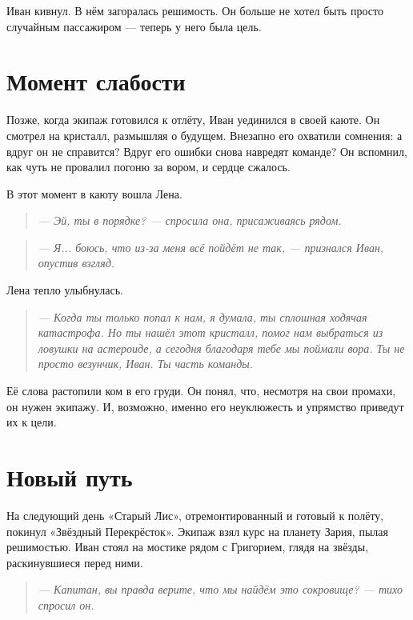 \documentclass[12pt,a4paper]{book} %
\newenvironment{dialogue}{\begin{quote}\itshape}{\end{quote}}
\begin{document}
Иван кивнул. В нём загоралась решимость. Он больше не хотел быть просто случайным пассажиром --- теперь у него была цель.

\section*{Момент слабости}

Позже, когда экипаж готовился к отлёту, Иван уединился в своей каюте. Он смотрел на кристалл, размышляя о будущем. Внезапно его охватили сомнения: а вдруг он не справится? Вдруг его ошибки снова навредят команде? Он вспомнил, как чуть не провалил погоню за вором, и сердце сжалось.

В этот момент в каюту вошла Лена.

\begin{dialogue}
--- Эй, ты в порядке? --- спросила она, присаживаясь рядом.
\end{dialogue}

\begin{dialogue}
--- Я... боюсь, что из-за меня всё пойдёт не так, --- признался Иван, опустив взгляд.
\end{dialogue}

Лена тепло улыбнулась.

\begin{dialogue}
--- Когда ты только попал к нам, я думала, ты сплошная ходячая катастрофа. Но ты нашёл этот кристалл, помог нам выбраться из ловушки на астероиде, а сегодня благодаря тебе мы поймали вора. Ты не просто везунчик, Иван. Ты часть команды.
\end{dialogue}

Её слова растопили ком в его груди. Он понял, что, несмотря на свои промахи, он нужен экипажу. И, возможно, именно его неуклюжесть и упрямство приведут их к цели.

\section*{Новый путь}

На следующий день «Старый Лис», отремонтированный и готовый к полёту, покинул «Звёздный Перекрёсток». Экипаж взял курс на планету Зария, пылая решимостью. Иван стоял на мостике рядом с Григорием, глядя на звёзды, раскинувшиеся перед ними.

\begin{dialogue}
--- Капитан, вы правда верите, что мы найдём это сокровище? --- тихо спросил он.
\end{dialogue}
\end{document}

